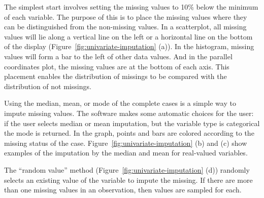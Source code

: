 \documentclass[article]{jss}
\begin{document}
The simplest start involves setting the missing values to 10\% below the minimum of each variable. The purpose of this is to place the missing values where they can be distinguished from the non-missing values. In a scatterplot, all missing values will lie along a vertical line on the left or a horizontal line on the bottom of the display (Figure~\ref{fig:univariate-imputation} (a)). In the histogram, missing values will form a bar to the left of other data values. And in the parallel coordinates plot, the missing values are at the bottom of each axis. This placement enables the distribution of missings to be compared with the distribution of not missings.

Using the median, mean, or mode of the complete cases is a simple way to impute missing values. The software makes some automatic choices for the user: if the user selects median or mean imputation, but the variable type is categorical the mode is returned.  In the graph, points and bars are colored according to the missing status of the case. Figure~\ref{fig:univariate-imputation} (b) and (c) show examples of the imputation by the median and mean for real-valued variables.

The ``random value'' method (Figure~\ref{fig:univariate-imputation} (d)) randomly selects an existing value of the variable to impute the missing. If there are more than one missing values in an observation, then values are sampled for each.
\end{document}
